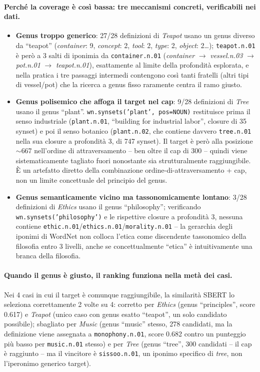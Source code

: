 \documentclass[12pt,a4paper]{article}
\begin{document}
\paragraph{Perch\'e la coverage \`e cos\`i bassa: tre meccanismi concreti, verificabili nei dati.}
\begin{itemize}
  \item \textbf{Genus troppo generico}: 27/28 definizioni di \textit{Teapot} usano un genus diverso da ``teapot'' (\textit{container}: 9, \textit{concept}: 2, \textit{tool}: 2, \textit{type}: 2, \textit{object}: 2\dots); \texttt{teapot.n.01} \`e per\`o a 3 salti di iponimia da \texttt{container.n.01} (\textit{container} $\to$ \textit{vessel.n.03} $\to$ \textit{pot.n.01} $\to$ \textit{teapot.n.01}), esattamente al limite della profondit\`a esplorata, e nella pratica i tre passaggi intermedi contengono cos\`i tanti fratelli (altri tipi di vessel/pot) che la ricerca a genus fisso raramente centra il ramo giusto.
  \item \textbf{Genus polisemico che affoga il target nel cap}: 9/28 definizioni di \textit{Tree} usano il genus ``plant''. \texttt{wn.synsets('plant', pos=NOUN)} restituisce prima il senso industriale (\texttt{plant.n.01}, ``building for industrial labor'', closure di 35 synset) e poi il senso botanico (\texttt{plant.n.02}, che contiene davvero \texttt{tree.n.01} nella sua closure a profondit\`a 3, di 747 synset). Il target \`e per\`o alla posizione $\sim$667 nell'ordine di attraversamento -- ben oltre il cap di 300 -- quindi viene sistematicamente tagliato fuori nonostante sia strutturalmente raggiungibile. \`E un artefatto diretto della combinazione ordine-di-attraversamento + cap, non un limite concettuale del principio del genus.
  \item \textbf{Genus semanticamente vicino ma tassonomicamente lontano}: 3/28 definizioni di \textit{Ethics} usano il genus ``philosophy''; verificando \texttt{wn.synsets('philosophy')} e le rispettive closure a profondit\`a 3, nessuna contiene \texttt{ethic.n.01}/\texttt{ethics.n.01}/\texttt{morality.n.01} -- la gerarchia degli iponimi di WordNet non colloca l'etica come discendente tassonomico della filosofia entro 3 livelli, anche se concettualmente ``etica'' \`e intuitivamente una branca della filosofia.
\end{itemize}

\paragraph{Quando il genus \`e giusto, il ranking funziona nella met\`a dei casi.} Nei 4 casi in cui il target \`e comunque raggiungibile, la similarit\`a SBERT lo seleziona correttamente 2 volte su 4: corretto per \textit{Ethics} (genus ``principles'', score 0.617) e \textit{Teapot} (unico caso con genus esatto ``teapot'', un solo candidato possibile); sbagliato per \textit{Music} (genus ``music'' stesso, 278 candidati, ma la definizione viene assegnata a \texttt{monophony.n.01}, score 0.682 contro un punteggio pi\`u basso per \texttt{music.n.01} stesso) e per \textit{Tree} (genus ``tree'', 300 candidati -- il cap \`e raggiunto -- ma il vincitore \`e \texttt{sissoo.n.01}, un iponimo specifico di \textit{tree}, non l'iperonimo generico target).
\end{document}
